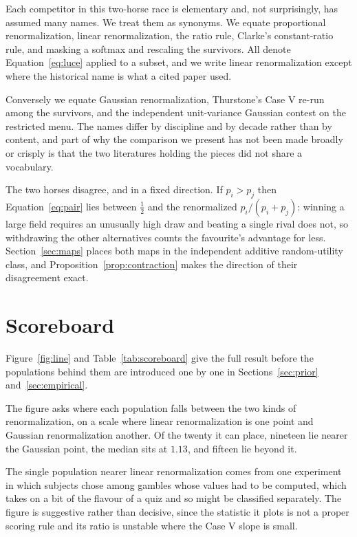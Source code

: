 \documentclass[11pt]{article}
\theoremstyle{italichead}
\begin{document}
Each competitor in this two-horse race is elementary and, not surprisingly, has assumed many
names. We treat them as synonyms. We equate proportional renormalization, linear renormalization,
the ratio rule, Clarke's constant-ratio rule, and masking a softmax and rescaling the survivors.
All denote Equation~\eqref{eq:luce} applied to a subset, and we write linear renormalization
except where the historical name is what a cited paper used.

Conversely we equate Gaussian renormalization, Thurstone's Case V re-run among the survivors, and
the independent unit-variance Gaussian contest on the restricted menu. The names differ by
discipline and by decade rather than by content, and part of why the comparison we present has
not been made broadly or crisply is that the two literatures holding the pieces did not share a
vocabulary.

The two horses disagree, and in a fixed direction. If $p_i > p_j$ then Equation~\eqref{eq:pair}
lies between $\tfrac12$ and the renormalized $p_i/(p_i+p_j)$: winning a large field requires an
unusually high draw and beating a single rival does not, so withdrawing the other alternatives
counts the favourite's advantage for less. Section~\ref{sec:maps} places both maps in the
independent additive random-utility class, and Proposition~\ref{prop:contraction} makes the
direction of their disagreement exact.

\section{Scoreboard}

Figure~\ref{fig:line} and Table~\ref{tab:scoreboard} give the full result before the
populations behind them are introduced one by one in Sections~\ref{sec:prior}
and~\ref{sec:empirical}.

The figure asks where each population falls between the two kinds of renormalization, on a scale
where linear renormalization is one point and Gaussian renormalization another. Of the twenty it
can place, nineteen lie nearer the Gaussian point, the median sits at $1.13$, and fifteen lie
beyond it.

The single population nearer linear renormalization comes from one experiment in which subjects
chose among gambles whose values had to be computed, which takes on a bit of the flavour of a quiz
and so might be classified separately. The figure is suggestive rather than decisive, since the
statistic it plots is not a proper scoring rule and its ratio is unstable where the Case V slope
is small.
\end{document}
